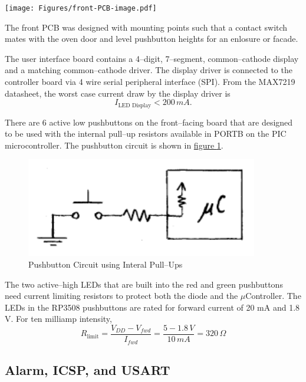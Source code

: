 \documentclass[10pt, twocolumn]{article}
\begin{document}
\begin{center}
	\texttt{[image: Figures/front-PCB-image.pdf]}
	\label{front-facing-pcb}
\end{center}

The front PCB was designed with mounting points
such that a contact switch mates with the oven door and 
level pushbutton heights for an enlosure or facade.

The user interface board contains a 4--digit, 7--segment, common--cathode
display and a matching common--cathode driver. The display driver
is connected to the controller board via 4 wire serial peripheral interface (SPI).
From the MAX7219 datasheet, the worst case current draw by the display driver
is
\begin{equation}
I_{\textrm{LED Display}}<200\,mA.
\end{equation}

There are 6 active low
pushbuttons on the front--facing board that are designed to be used
with the internal pull--up resistors available in \textrm{PORTB}
on the PIC microcontroller. The pushbutton circuit is shown in
\hyperref[pushbutton-circuit]{figure \ref{pushbutton-circuit}}.

\begin{figure}
	\centering
	\includegraphics[width=0.6\columnwidth]{Figures/pushbutton-circuit.pdf}
	\caption{Pushbutton Circuit using Interal Pull--Ups}
	\label{pushbutton-circuit}
\end{figure}

The two active--high LEDs that are built into the red and green pushbuttons
need current limiting resistors to protect both the diode and the $\mu$Controller.
The LEDs in the RP3508 pushbuttons are rated for forward current of 20 mA and 1.8 V.
For ten milliamp intensity,
\begin{equation*}
R_{\textrm{limit}}=\frac{V_{DD}-V_{fwd}}{I_{fwd}}=\frac{5-1.8\,V}{10\,mA}=320\,\Omega
\end{equation*}

\subsection{Alarm, ICSP, and USART}
\end{document}

